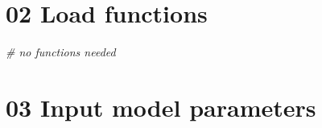 \documentclass[
]{article}
\newenvironment{Shaded}{\begin{snugshade}}{\end{snugshade}}
\newcommand{\CommentTok}[1]{\textcolor[rgb]{0.56,0.35,0.01}{\textit{#1}}}
\begin{document}
\hypertarget{load-functions}{%
\section{02 Load functions}\label{load-functions}}

\begin{Shaded}
\begin{Highlighting}[]
\CommentTok{# no functions needed}
\end{Highlighting}
\end{Shaded}

\hypertarget{input-model-parameters}{%
\section{03 Input model parameters}\label{input-model-parameters}}
\end{document}
